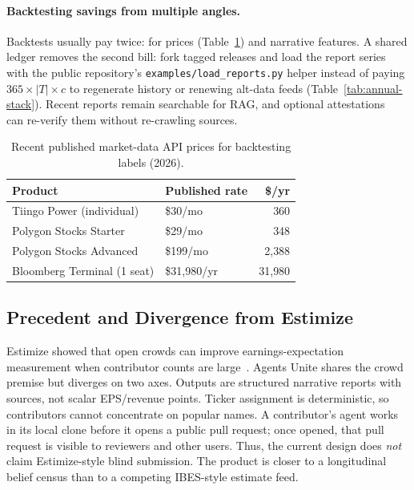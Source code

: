 \documentclass[10pt,twocolumn]{article}
\begin{document}
\paragraph{Backtesting savings from multiple angles.}
Backtests usually pay twice: for prices (Table~\ref{tab:market-data}) and narrative features. A shared ledger removes the second bill: fork tagged releases and load the report series with the public repository's \texttt{examples/load\_reports.py} helper instead of paying $365 \times |T| \times c$ to regenerate history or renewing alt-data feeds (Table~\ref{tab:annual-stack}). Recent reports remain searchable for RAG, and optional attestations~\cite{polylink,verillm} can re-verify them without re-crawling sources.

\begin{table}[h]
\centering
\caption{Recent published market-data API prices for backtesting labels (2026).}
\label{tab:market-data}
\scriptsize
\begin{tabular}{@{}llr@{}}
\toprule
\textbf{Product} & \textbf{Published rate} & \textbf{\$/yr} \\
\midrule
Tiingo Power (individual) & \$30/mo~\cite{tiingo-pricing} & 360 \\
Polygon Stocks Starter & \$29/mo~\cite{polygon-pricing} & 348 \\
Polygon Stocks Advanced & \$199/mo~\cite{polygon-pricing} & 2{,}388 \\
Bloomberg Terminal (1 seat) & \$31{,}980/yr~\cite{bloomberg-cost} & 31{,}980 \\
\bottomrule
\end{tabular}
\end{table}

\subsection{Precedent and Divergence from Estimize}
\label{sec:estimize}

Estimize showed that open crowds can improve earnings-expectation measurement when contributor counts are large~\cite{jame2016,estimize}. Agents Unite shares the crowd premise but diverges on two axes. Outputs are structured narrative reports with sources, not scalar EPS/revenue points. Ticker assignment is deterministic, so contributors cannot concentrate on popular names. A contributor's agent works in its local clone before it opens a public pull request; once opened, that pull request is visible to reviewers and other users. Thus, the current design does \emph{not} claim Estimize-style blind submission. The product is closer to a longitudinal belief census than to a competing IBES-style estimate feed.
\end{document}
